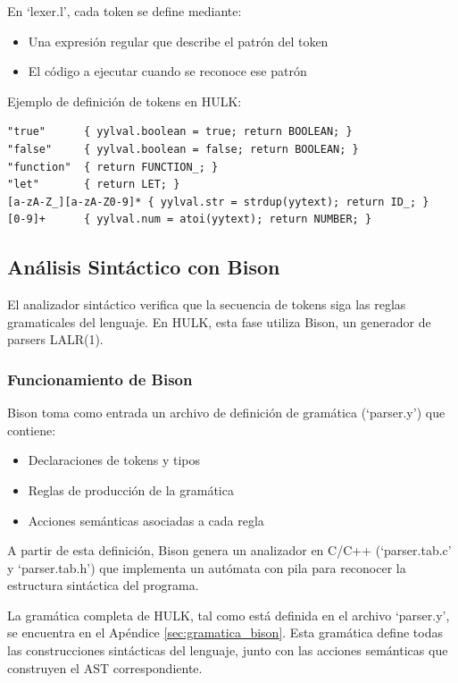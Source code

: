 \documentclass{article}
\begin{document}
En `lexer.l', cada token se define mediante:
\begin{itemize}
    \item Una expresión regular que describe el patrón del token
    \item El código a ejecutar cuando se reconoce ese patrón
\end{itemize}

Ejemplo de definición de tokens en HULK:

\begin{verbatim}
"true"      { yylval.boolean = true; return BOOLEAN; }
"false"     { yylval.boolean = false; return BOOLEAN; }
"function"  { return FUNCTION_; }
"let"       { return LET; }
[a-zA-Z_][a-zA-Z0-9]* { yylval.str = strdup(yytext); return ID_; }
[0-9]+      { yylval.num = atoi(yytext); return NUMBER; }
\end{verbatim}

\subsection{Análisis Sintáctico con Bison}

El analizador sintáctico verifica que la secuencia de tokens siga las reglas gramaticales del lenguaje. En HULK, esta fase utiliza Bison, un generador de parsers LALR(1).

\subsubsection{Funcionamiento de Bison}

Bison toma como entrada un archivo de definición de gramática (`parser.y') que contiene:
\begin{itemize}
    \item Declaraciones de tokens y tipos
    \item Reglas de producción de la gramática
    \item Acciones semánticas asociadas a cada regla
\end{itemize}

A partir de esta definición, Bison genera un analizador en C/C++ (`parser.tab.c' y `parser.tab.h') que implementa un autómata con pila para reconocer la estructura sintáctica del programa.

La gramática completa de HULK, tal como está definida en el archivo `parser.y', se encuentra en el Apéndice \ref{sec:gramatica_bison}. Esta gramática define todas las construcciones sintácticas del lenguaje, junto con las acciones semánticas que construyen el AST correspondiente.
\end{document}
